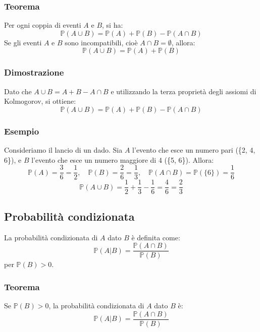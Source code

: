 \documentclass{article}
\begin{document}
\subsubsection{Teorema}
Per ogni coppia di eventi \(A\) e \(B\), si ha:
\[
\mathbb{P}(A \cup B) = \mathbb{P}(A) + \mathbb{P}(B) - \mathbb{P}(A \cap B)
\]
Se gli eventi \(A\) e \(B\) sono incompatibili, cioè \(A \cap B = \emptyset\), allora:
\[
    \mathbb{P}(A \cup B) = \mathbb{P}(A) + \mathbb{P}(B)
\]

\subsubsection{Dimostrazione}
Dato che \(A \cup B = A + B - A \cap B\) e utilizzando la terza proprietà degli assiomi di Kolmogorov, si ottiene:
\[
    \mathbb{P}(A \cup B) = \mathbb{P}(A) + \mathbb{P}(B) - \mathbb{P}(A \cap B)
\]

\subsubsection{Esempio}
Consideriamo il lancio di un dado. Sia \(A\) l'evento che esce un numero pari (\{2, 4, 6\}), e \(B\) l'evento che esce un numero maggiore di 4 (\{5, 6\}). Allora:
\[
    \mathbb{P}(A) = \frac{3}{6} = \frac{1}{2}, \quad \mathbb{P}(B) = \frac{2}{6} = \frac{1}{3}, \quad \mathbb{P}(A \cap B) = \mathbb{P}(\{6\}) = \frac{1}{6}
\]
\[
    \mathbb{P}(A \cup B) = \frac{1}{2} + \frac{1}{3} - \frac{1}{6} = \frac{4}{6} = \frac{2}{3}
\]


\newpage
\subsection{Probabilità condizionata}
La probabilità condizionata di \(A\) dato \(B\) è definita come:
\[
    \mathbb{P}(A | B) = \frac{\mathbb{P}(A \cap B)}{\mathbb{P}(B)}
\]
per \(\mathbb{P}(B) > 0\).

\subsubsection{Teorema}
Se \(\mathbb{P}(B) > 0\), la probabilità condizionata di \(A\) dato \(B\) è:
\[
    \mathbb{P}(A | B) = \frac{\mathbb{P}(A \cap B)}{\mathbb{P}(B)}
\]
\end{document}
